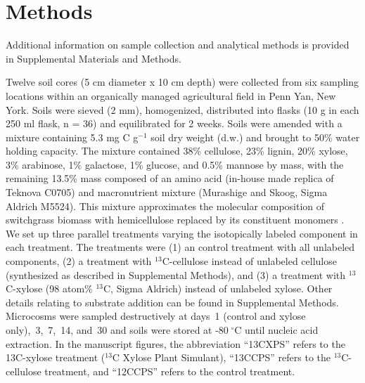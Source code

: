\section{Methods}
Additional information on sample collection and analytical methods is provided
in Supplemental Materials and Methods. 

Twelve soil cores (5 cm diameter x 10 cm depth) were collected from six 
sampling locations within an organically managed agricultural field in Penn
Yan, New York. Soils were sieved (2 mm), homogenized, distributed into flasks
(10 g in each 250 ml flask, n = 36) and equilibrated for 2 weeks. Soils were
amended with a mixture containing 5.3 mg C g$^{-1}$ soil dry weight (d.w.) and
brought to 50\% water holding capacity. The mixture contained 38\% cellulose,
23\% lignin, 20\% xylose, 3\% arabinose, 1\% galactose, 1\% glucose, and 0.5\%
mannose by mass, with the remaining 13.5\% mass composed of an amino acid
(in-house made replica of Teknova C0705) and macronutrient mixture (Murashige
and Skoog, Sigma Aldrich M5524).  This mixture approximates the molecular
composition of switchgrass biomass with hemicellulose replaced by its
constituent monomers \citep{Schneckenberger_2008}. We set up three parallel
treatments varying the isotopically labeled component in each treatment. The
treatments were (1) an control treatment with all unlabeled components, (2)
a treatment with $^{13}$C-cellulose instead of unlabeled cellulose (synthesized
as described in Supplemental Methods), and (3) a treatment with $^{13}$C-xylose
(98 atom\% $^{13}$C, Sigma Aldrich) instead of unlabeled xylose. Other details
relating to substrate addition can be found in Supplemental Methods. Microcosms
were sampled destructively at days~1 (control and xylose only),~3,~7,~14,
and~30 and soils were stored at -80 $^{\circ}$C until nucleic acid extraction.
In the manuscript figures, the abbreviation “13CXPS” refers to the 13C-xylose
treatment ($^{13}$C Xylose Plant Simulant), “13CCPS” refers to the
$^{13}$C-cellulose treatment, and “12CCPS” refers to the control treatment.

